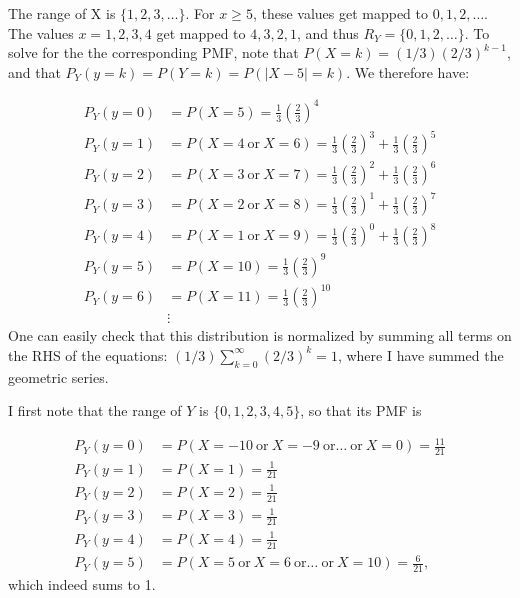 \begin{problem}{15} The range of X is $\{1, 2, 3, \ldots \}$.  For $x\ge 5$, these values get mapped to $0, 1, 2, \ldots$.  The values $x=1, 2, 3, 4$ get mapped to $4, 3, 2, 1$, and thus $R_Y=\{0, 1, 2, \ldots\}$.  To solve for the the corresponding PMF, note that $P(X=k) = (1/3)(2/3)^{k-1}$, and that $P_Y(y=k)=P(Y=k)=P(|X-5|=k)$.  We therefore have:


  \begin{align*}
                                   P_Y(y=0) &= P(X=5) = \frac{1}{3}\left( \frac{2}{3}\right)^{4} \\
                                   P_Y(y=1) &= P(X=4~ \mathrm{or}~ X=6) =   \frac{1}{3} \left(\frac{2}{3}\right)^{3}+ \frac{1}{3}\left( \frac{2}{3}\right)^{5} \\
                                  P_Y(y=2) &= P(X=3~ \mathrm{or}~ X=7) =   \frac{1}{3} \left(\frac{2}{3}\right)^{2}+ \frac{1}{3}\left( \frac{2}{3}\right)^{6} \\
                                   P_Y(y=3) &=P(X=2~ \mathrm{or}~ X=8) =  \frac{1}{3}\left(\frac{2}{3}\right)^{1}+ \frac{1}{3} \left(\frac{2}{3}\right)^{7}   \\
                                   P_Y(y=4) &=P(X=1~ \mathrm{or}~ X=9) =   \frac{1}{3}\left( \frac{2}{3}\right)^{0}+ \frac{1}{3}\left( \frac{2}{3}\right)^{8} \\ 
                                   P_Y(y=5) &= P(X=10) =  \frac{1}{3}\left( \frac{2}{3}\right)^{9} \\
                                   P_Y(y=6) &= P(X=11) =  \frac{1}{3} \left(\frac{2}{3}\right)^{10} \\
                                  & \vdots 
  \end{align*}
One can easily check that this distribution is normalized by summing all terms on the RHS of the equations: $(1/3)\sum_{k=0}^{\infty}(2/3)^k =1$, where I have summed the geometric series.

\end{problem}

\begin{problem}{16} I first note that the range of $Y$ is $\{0, 1, 2, 3, 4, 5\}$, so that its PMF is

  \begin{align*}
                                   P_Y(y=0) &= P(X=-10~ \mathrm{or}~ X=-9~ \mathrm{or} \ldots ~ \mathrm{or}~ X=0) = \frac{11}{21} \\
                                   P_Y(y=1) &=P(X=1)  =  \frac{1}{21} \\
                                  P_Y(y=2) &= P(X=2) =   \frac{1}{21} \\
                                   P_Y(y=3) &=P(X=3) = \frac{1}{21}   \\
                                   P_Y(y=4) &=P(X=4) =   \frac{1}{21} \\ 
                                   P_Y(y=5) &= P(X=5~ \mathrm{or}~ X=6~ \mathrm{or} \ldots ~ \mathrm{or}~ X=10) =  \frac{6}{21},
  \end{align*}
which indeed sums to 1.

\end{problem}

